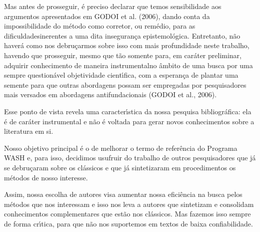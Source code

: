 \documentclass[
12pt,		%
openright,	%
twoside,  %
a4paper,			%
chapter=TITLE,		%
english,			%
french,				%
spanish,			%
brazil				%
]{USPSC-classe/USPSC}
\begin{document}
Mas antes de prosseguir, \'e preciso declarar que temos sensibilidade aos argumentos apresentados em  GODOI et al. (2006), dando conta da impossibilidade \textquotedbl do m\'etodo como corretor, ou rem\'edio, para as dificuldades\textquotedbl  inerentes a uma dita \textquotedbl inseguran\c{c}a epistemol\'ogica\textquotedbl . Entretanto, n\~ao haver\'a como nos debru\c{c}armos sobre isso com mais profundidade neste trabalho, havendo que prosseguir, mesmo que t\~ao somente para, em car\'ater preliminar, \textquotedbl adquirir conhecimento de maneira instrumental\textquotedbl  no \^ambito de uma busca por uma sempre question\'avel \textquotedbl objetividade cient\'{\i}fica\textquotedbl , com a esperan\c{c}a de plantar uma semente para que outras abordagens possam ser empregadas por  pesquisadores mais versados em abordagens antifundacionais  (GODOI et al., 2006).









Esse ponto de vista revela uma caracter\'{\i}stica da nossa pesquisa bibliogr\'afica: ela \'e de car\'ater instrumental e n\~ao \'e voltada para gerar novos conhecimentos sobre a literatura em si.









Nosso objetivo principal \'e o de melhorar o termo de refer\^encia do Programa WASH e, para isso, decidimos usufruir do trabalho de outros pesquisadores que j\'a se debru\c{c}aram sobre os cl\'assicos e que j\'a sintetizaram em procedimentos os m\'etodos de nosso interesse.









Assim, nossa escolha de autores visa aumentar nossa efici\^encia na busca pelos m\'etodos que nos interessam e isso nos leva a autores que sintetizam e consolidam conhecimentos complementares que est\~ao nos cl\'assicos. Mas fazemos isso sempre de forma cr\'{\i}tica, para que n\~ao nos suportemos em textos de baixa confiabilidade.
\end{document}
